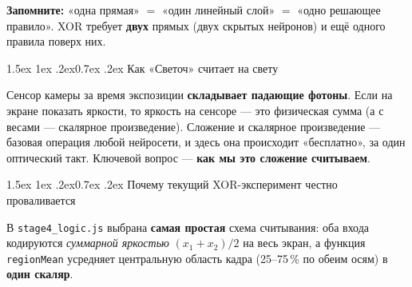 \documentclass[11pt]{article}
\makeatletter
\renewcommand\section{\@startsection{section}{1}{\z@}%
  {1.5ex \@plus 1ex \@minus .2ex}{0.7ex \@plus.2ex}%
  {\sffamily\Large\bfseries\color{accent}}}
\makeatother
\begin{document}
\noindent\textbf{Запомните:} «одна прямая» $=$ «один линейный слой» $=$ «одно
решающее правило». XOR требует \textbf{двух} прямых (двух скрытых нейронов) и ещё
одного правила поверх них.

\section{Как «Светоч» считает на свету}

Сенсор камеры за время экспозиции \textbf{складывает падающие фотоны}. Если на
экране показать яркости, то яркость на сенсоре — это физическая сумма (а с
весами — скалярное произведение). Сложение и скалярное произведение — базовая
операция любой нейросети, и здесь она происходит «бесплатно», за один оптический
такт. Ключевой вопрос — \textbf{как мы это сложение считываем}.

\section{Почему текущий XOR-эксперимент честно проваливается}

В \texttt{stage4\_logic.js} выбрана \textbf{самая простая} схема считывания:
оба входа кодируются \emph{суммарной яркостью} $(x_1+x_2)/2$ на весь экран, а
функция \texttt{regionMean} усредняет центральную область кадра (25–75\,\% по
обеим осям) в \textbf{один скаляр}.
\end{document}
